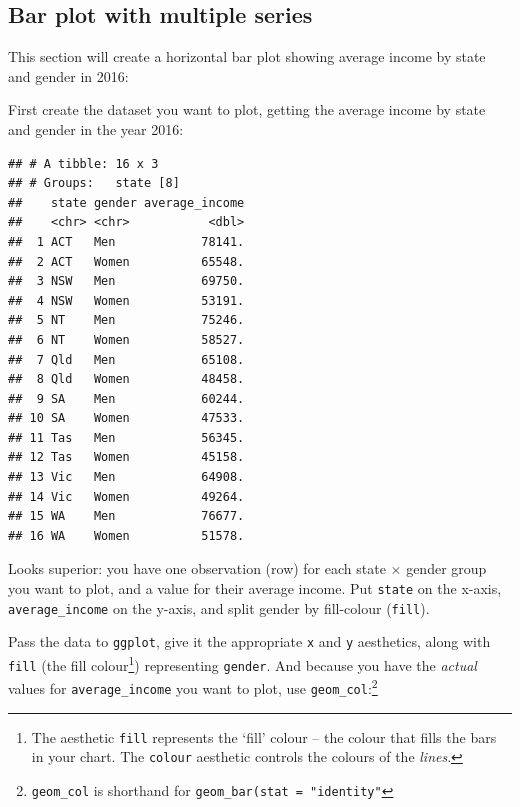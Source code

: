 \documentclass[]{book}
\newenvironment{Shaded}{\begin{snugshade}}{\end{snugshade}}
\newcommand{\DataTypeTok}[1]{\textcolor[rgb]{0.13,0.29,0.53}{#1}}
\newcommand{\DecValTok}[1]{\textcolor[rgb]{0.00,0.00,0.81}{#1}}
\newcommand{\KeywordTok}[1]{\textcolor[rgb]{0.13,0.29,0.53}{\textbf{#1}}}
\newcommand{\NormalTok}[1]{#1}
\newcommand{\OperatorTok}[1]{\textcolor[rgb]{0.81,0.36,0.00}{\textbf{#1}}}
\newcommand{\StringTok}[1]{\textcolor[rgb]{0.31,0.60,0.02}{#1}}
\begin{document}
\hypertarget{bar-multi}{%
\subsection{Bar plot with multiple series}\label{bar-multi}}

This section will create a horizontal bar plot showing average income by state and gender in 2016:

First create the dataset you want to plot, getting the average income by state and gender in the year 2016:

\begin{Shaded}
\end{Shaded}

\begin{verbatim}
## # A tibble: 16 x 3
## # Groups:   state [8]
##    state gender average_income
##    <chr> <chr>           <dbl>
##  1 ACT   Men            78141.
##  2 ACT   Women          65548.
##  3 NSW   Men            69750.
##  4 NSW   Women          53191.
##  5 NT    Men            75246.
##  6 NT    Women          58527.
##  7 Qld   Men            65108.
##  8 Qld   Women          48458.
##  9 SA    Men            60244.
## 10 SA    Women          47533.
## 11 Tas   Men            56345.
## 12 Tas   Women          45158.
## 13 Vic   Men            64908.
## 14 Vic   Women          49264.
## 15 WA    Men            76677.
## 16 WA    Women          51578.
\end{verbatim}

Looks superior: you have one observation (row) for each state \(\times\) gender group you want to plot, and a value for their average income. Put \texttt{state} on the x-axis, \texttt{average\_income} on the y-axis, and split gender by fill-colour (\texttt{fill}).

Pass the data to \texttt{ggplot}, give it the appropriate \texttt{x} and \texttt{y} aesthetics, along with \texttt{fill} (the fill colour\footnote{The aesthetic \texttt{fill} represents the `fill' colour -- the colour that fills the bars in your chart. The \texttt{colour} aesthetic controls the colours of the \emph{lines}.}) representing \texttt{gender}. And because you have the \emph{actual} values for \texttt{average\_income} you want to plot, use \texttt{geom\_col}:\footnote{\texttt{geom\_col} is shorthand for \texttt{geom\_bar(stat\ =\ "identity"}}
\end{document}
